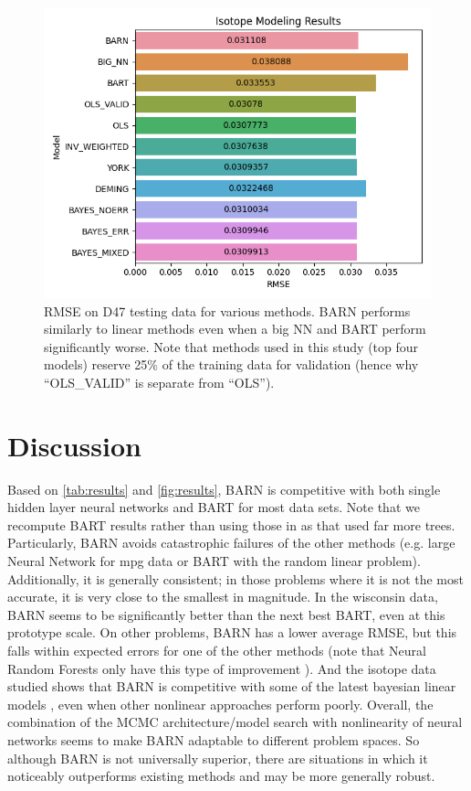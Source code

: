 \documentclass[12pt]{article}
\begin{document}
\begin{figure}[ht]
\centering
    \includegraphics[scale=.7]{iso_results.png}
    \caption{RMSE on D47 testing data for various methods.  BARN performs similarly to linear methods \cite{roman2022bayclump} even when a big NN and BART perform significantly worse.  Note that methods used in this study (top four models) reserve 25\% of the training data for validation (hence why ``OLS\_VALID'' is separate from ``OLS'').}
    \label{fig:iso_results}
\end{figure}



\section{Discussion}\label{sec:dis}

Based on \autoref{tab:results} and \autoref{fig:results}, BARN is competitive with both single hidden layer neural networks and BART for most data sets.  Note that we recompute BART results rather than using those in \cite{biau2019neural} as that used far more trees.  Particularly, BARN avoids catastrophic failures of the other methods (e.g. large Neural Network for mpg data or BART with the random linear problem).  Additionally, it is generally consistent; in those problems where it is not the most accurate, it is very close to the smallest in magnitude.  In the wisconsin data, BARN seems to be significantly better than the next best BART, even at this prototype scale.  On other problems, BARN has a lower average RMSE, but this falls within expected errors for one of the other methods (note that Neural Random Forests only have this type of improvement \cite{biau2019neural}).  And the isotope data studied shows that BARN is competitive with some of the latest bayesian linear models \cite{roman2022bayclump}, even when other nonlinear approaches perform poorly.  Overall, the combination of the MCMC architecture/model search with nonlinearity of neural networks seems to make BARN adaptable to different problem spaces.  So although BARN is not universally superior, there are situations in which it noticeably outperforms existing methods and may be more generally robust.
\end{document}
